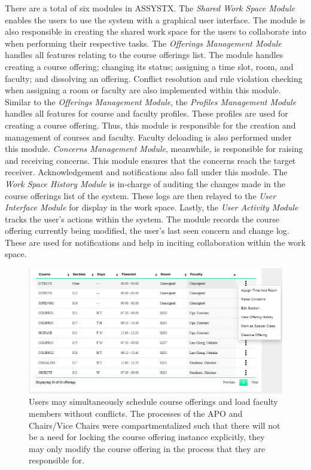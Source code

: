 There are a total of six modules in ASSYSTX. The \textit{Shared Work Space Module} enables the users to use the system with a graphical user interface. The module is also responsible in creating the shared work space for the users to collaborate into when performing their respective tasks. The \textit{Offerings Management Module} handles all features relating to the course offerings list. The module handles creating a course offering; changing its status; assigning a time slot, room, and faculty; and dissolving an offering. Conflict resolution and rule violation checking when assigning a room or faculty are also implemented within this module. Similar to the \textit{Offerings Management Module}, the \textit{Profiles Management Module} handles all features for course and faculty profiles. These profiles are used for creating a course offering. Thus, this module is responsible for the creation and management of courses and faculty. Faculty deloading is also performed under this module. \textit{Concerns Management Module}, meanwhile, is responsible for raising and receiving concerns. This module ensures that the concerns reach the target receiver. Acknowledgement and notifications also fall under this module. The \textit{Work Space History Module} is in-charge of auditing the changes made in the course offerings list of the system. These logs are then relayed to the \textit{User Interface Module} for display in the work space. Lastly, the \textit{User Activity Module} tracks the user's actions within the system. The module records the course offering currently being modified, the user's last seen concern and change log. These are used for notifications and help in inciting collaboration within the work space.

\begin{figure}[h]
   \centering
  \includegraphics[scale=0.5]{PCSC2019_latex/Screenshots/liveEditing.PNG}
   \caption{Users may simultaneously schedule course offerings and load faculty members without conflicts. The processes of the APO and Chairs/Vice Chairs were compartmentalized such that there will not be a need for locking the course offering instance explicitly, they may only modify the course offering in the process that they are responsible for.} \label{fig:liveEditing}
\end{figure}

